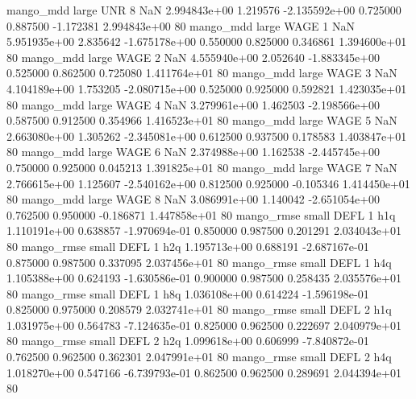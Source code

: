         mango_mdd      large      UNR                 8                  NaN 2.994843e+00      1.219576 -2.135592e+00 0.725000 0.887500      -1.172381 2.994843e+00 80
        mango_mdd      large     WAGE                 1                  NaN 5.951935e+00      2.835642 -1.675178e+00 0.550000 0.825000       0.346861 1.394600e+01 80
        mango_mdd      large     WAGE                 2                  NaN 4.555940e+00      2.052640 -1.883345e+00 0.525000 0.862500       0.725080 1.411764e+01 80
        mango_mdd      large     WAGE                 3                  NaN 4.104189e+00      1.753205 -2.080715e+00 0.525000 0.925000       0.592821 1.423035e+01 80
        mango_mdd      large     WAGE                 4                  NaN 3.279961e+00      1.462503 -2.198566e+00 0.587500 0.912500       0.354966 1.416523e+01 80
        mango_mdd      large     WAGE                 5                  NaN 2.663080e+00      1.305262 -2.345081e+00 0.612500 0.937500       0.178583 1.403847e+01 80
        mango_mdd      large     WAGE                 6                  NaN 2.374988e+00      1.162538 -2.445745e+00 0.750000 0.925000       0.045213 1.391825e+01 80
        mango_mdd      large     WAGE                 7                  NaN 2.766615e+00      1.125607 -2.540162e+00 0.812500 0.925000      -0.105346 1.414450e+01 80
        mango_mdd      large     WAGE                 8                  NaN 3.086991e+00      1.140042 -2.651054e+00 0.762500 0.950000      -0.186871 1.447858e+01 80
       mango_rmse      small     DEFL                 1                  h1q 1.110191e+00      0.638857 -1.970694e-01 0.850000 0.987500       0.201291 2.034043e+01 80
       mango_rmse      small     DEFL                 1                  h2q 1.195713e+00      0.688191 -2.687167e-01 0.875000 0.987500       0.337095 2.037456e+01 80
       mango_rmse      small     DEFL                 1                  h4q 1.105388e+00      0.624193 -1.630586e-01 0.900000 0.987500       0.258435 2.035576e+01 80
       mango_rmse      small     DEFL                 1                  h8q 1.036108e+00      0.614224 -1.596198e-01 0.825000 0.975000       0.208579 2.032741e+01 80
       mango_rmse      small     DEFL                 2                  h1q 1.031975e+00      0.564783 -7.124635e-01 0.825000 0.962500       0.222697 2.040979e+01 80
       mango_rmse      small     DEFL                 2                  h2q 1.099618e+00      0.606999 -7.840872e-01 0.762500 0.962500       0.362301 2.047991e+01 80
       mango_rmse      small     DEFL                 2                  h4q 1.018270e+00      0.547166 -6.739793e-01 0.862500 0.962500       0.289691 2.044394e+01 80
